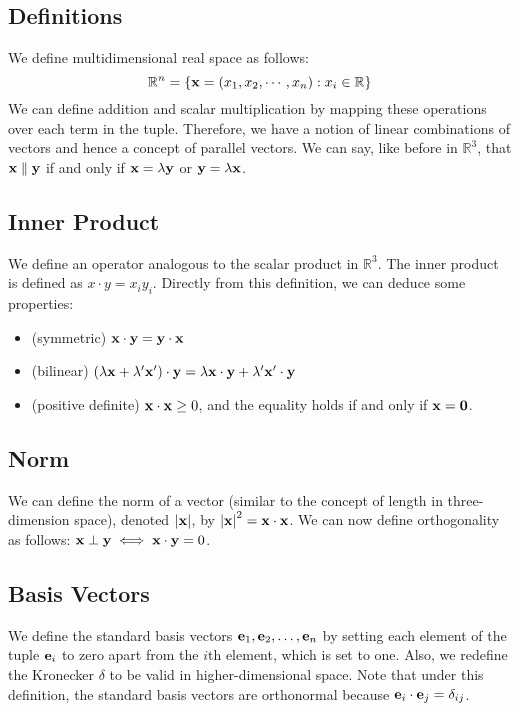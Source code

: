 \subsection{Definitions}
We define multidimensional real space as follows:
\[
	\mathbb R^n = \{ \vb x = (x_1, x_2, \cdots, x_n) : x_i \in \mathbb R \}
\]
We can define addition and scalar multiplication by mapping these operations over each term in the tuple.
Therefore, we have a notion of linear combinations of vectors and hence a concept of parallel vectors.
We can say, like before in \(\mathbb R^3\), that \(\vb x \parallel \vb y\) if and only if \(\vb x = \lambda \vb y\) or \(\vb y = \lambda \vb x\).

\subsection{Inner Product}
We define an operator analogous to the scalar product in \(\mathbb R^3\).
The inner product is defined as \(x \cdot y = x_i y_i\).
Directly from this definition, we can deduce some properties:
\begin{itemize}
	\item (symmetric) \(\vb x \cdot \vb y = \vb y \cdot \vb x\)
	\item (bilinear) \((\lambda \vb x + \lambda'\vb x')\cdot \vb y = \lambda \vb x\cdot \vb y + \lambda' \vb x' \cdot \vb y\)
	\item (positive definite) \(\vb x \cdot \vb x \geq 0\), and the equality holds if and only if \(\vb x = \vb 0\).
\end{itemize}

\subsection{Norm}
We can define the norm of a vector (similar to the concept of length in three-dimension space), denoted \(\abs {\vb x}\), by \(\abs{\vb x}^2 = \vb x \cdot \vb x\).
We can now define orthogonality as follows: \(\vb x \perp \vb y \iff \vb x \cdot \vb y = 0\).

\subsection{Basis Vectors}
We define the standard basis vectors \(\vb e_1, \vb e_2, \dots, \vb e_n\) by setting each element of the tuple \(\vb e_i\) to zero apart from the \(i\)th element, which is set to one.
Also, we redefine the Kronecker \(\delta\) to be valid in higher-dimensional space.
Note that under this definition, the standard basis vectors are orthonormal because \(\vb e_i \cdot \vb e_j = \delta_{ij}\).


